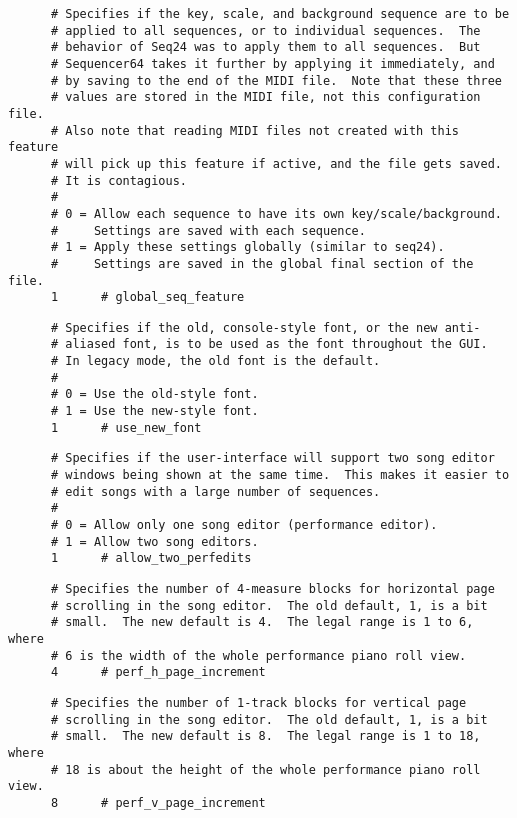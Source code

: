    \begin{verbatim}
      # Specifies if the key, scale, and background sequence are to be
      # applied to all sequences, or to individual sequences.  The
      # behavior of Seq24 was to apply them to all sequences.  But
      # Sequencer64 takes it further by applying it immediately, and
      # by saving to the end of the MIDI file.  Note that these three
      # values are stored in the MIDI file, not this configuration file.
      # Also note that reading MIDI files not created with this feature
      # will pick up this feature if active, and the file gets saved.
      # It is contagious.
      #
      # 0 = Allow each sequence to have its own key/scale/background.
      #     Settings are saved with each sequence.
      # 1 = Apply these settings globally (similar to seq24).
      #     Settings are saved in the global final section of the file.
      1      # global_seq_feature
   \end{verbatim}

   \begin{verbatim}
      # Specifies if the old, console-style font, or the new anti-
      # aliased font, is to be used as the font throughout the GUI.
      # In legacy mode, the old font is the default.
      #
      # 0 = Use the old-style font.
      # 1 = Use the new-style font.
      1      # use_new_font
   \end{verbatim}

   \begin{verbatim}
      # Specifies if the user-interface will support two song editor
      # windows being shown at the same time.  This makes it easier to
      # edit songs with a large number of sequences.
      #
      # 0 = Allow only one song editor (performance editor).
      # 1 = Allow two song editors.
      1      # allow_two_perfedits
   \end{verbatim}

   \begin{verbatim}
      # Specifies the number of 4-measure blocks for horizontal page
      # scrolling in the song editor.  The old default, 1, is a bit
      # small.  The new default is 4.  The legal range is 1 to 6, where
      # 6 is the width of the whole performance piano roll view.
      4      # perf_h_page_increment
   \end{verbatim}

   \begin{verbatim}
      # Specifies the number of 1-track blocks for vertical page
      # scrolling in the song editor.  The old default, 1, is a bit
      # small.  The new default is 8.  The legal range is 1 to 18, where
      # 18 is about the height of the whole performance piano roll view.
      8      # perf_v_page_increment
   \end{verbatim}

